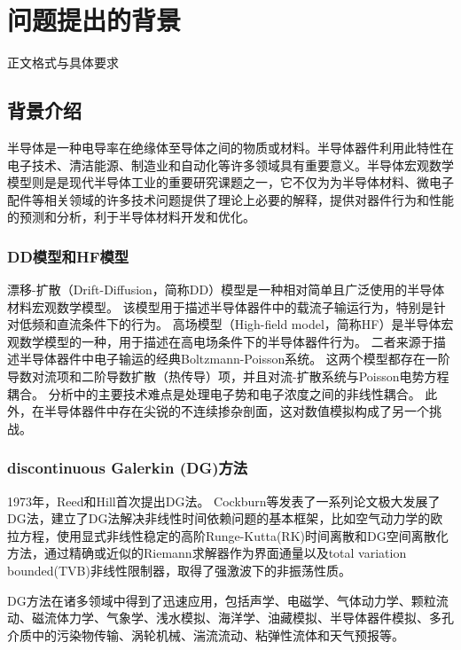 \section{问题提出的背景}

\par 正文格式与具体要求\cite{zjuthesisrules}

\subsection{背景介绍}
半导体是一种电导率在绝缘体至导体之间的物质或材料。半导体器件利用此特性在电子技术、清洁能源、制造业和自动化等许多领域具有重要意义。半导体宏观数学模型则是是现代半导体工业的重要研究课题之一，它不仅为为半导体材料、微电子配件等相关领域的许多技术问题提供了理论上必要的解释，提供对器件行为和性能的预测和分析，利于半导体材料开发和优化。
\subsubsection{DD模型\cite{cercignani2000device}和HF模型\cite{cercignani2000device}}
漂移-扩散（Drift-Diffusion，简称DD）模型是一种相对简单且广泛使用的半导体材料宏观数学模型。
该模型用于描述半导体器件中的载流子输运行为，特别是针对低频和直流条件下的行为。
高场模型（High-field model，简称HF）是半导体宏观数学模型的一种，用于描述在高电场条件下的半导体器件行为。
二者来源于描述半导体器件中电子输运的经典Boltzmann-Poisson系统。
这两个模型都存在一阶导数对流项和二阶导数扩散（热传导）项，并且对流-扩散系统与Poisson电势方程耦合\cite{cercignani2000device}。
分析中的主要技术难点是处理电子势和电子浓度之间的非线性耦合。
此外，在半导体器件中存在尖锐的不连续掺杂剖面，这对数值模拟构成了另一个挑战。
\subsubsection{discontinuous Galerkin (DG)方法}
1973年，Reed和Hill首次提出DG法\cite{reed1973triangular}。
Cockburn等发表了一系列论文极大发展了DG法，建立了DG法解决非线性时间依赖问题的基本框架\cite{reed1973triangular,cockburn1991runge,cockburn1989tvb2,cockburn1989tvb3,cockburn1990runge,cockburn1998runge}，比如空气动力学的欧拉方程，使用显式非线性稳定的高阶Runge-Kutta(RK)时间离散和DG空间离散化方法，通过精确或近似的Riemann求解器作为界面通量以及total variation bounded(TVB)非线性限制器，取得了强激波下的非振荡性质。

DG方法在诸多领域中得到了迅速应用，包括声学、电磁学、气体动力学、颗粒流动、磁流体力学、气象学、浅水模拟、海洋学、油藏模拟、半导体器件模拟、多孔介质中的污染物传输、涡轮机械、湍流流动、粘弹性流体和天气预报等\cite{cockburn2000development}。

